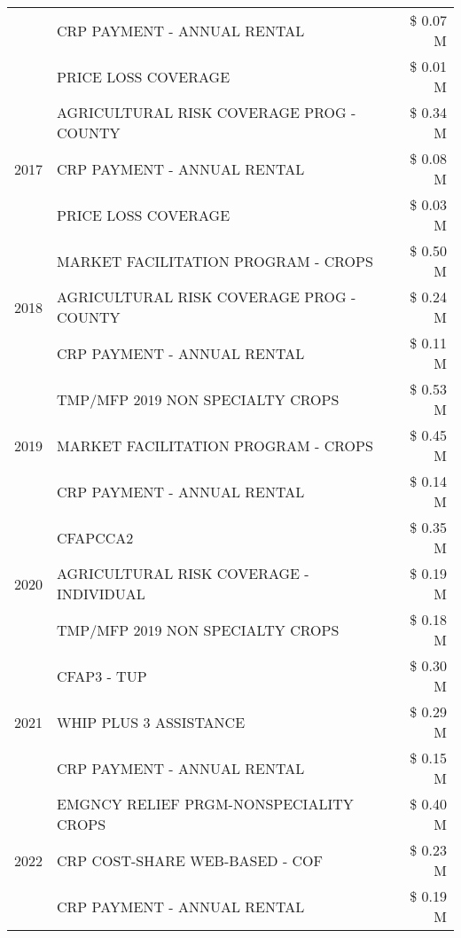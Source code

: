 \begin{tabular}{llr}
 & CRP PAYMENT - ANNUAL RENTAL & \$ 0.07 M \\
 & PRICE LOSS COVERAGE & \$ 0.01 M \\
\cline{1-3}
\multirow[t]{3}{*}{2017} & AGRICULTURAL RISK COVERAGE PROG - COUNTY & \$ 0.34 M \\
 & CRP PAYMENT - ANNUAL RENTAL & \$ 0.08 M \\
 & PRICE LOSS COVERAGE & \$ 0.03 M \\
\cline{1-3}
\multirow[t]{3}{*}{2018} & MARKET FACILITATION PROGRAM - CROPS & \$ 0.50 M \\
 & AGRICULTURAL RISK COVERAGE PROG - COUNTY & \$ 0.24 M \\
 & CRP PAYMENT - ANNUAL RENTAL & \$ 0.11 M \\
\cline{1-3}
\multirow[t]{3}{*}{2019} & TMP/MFP 2019 NON SPECIALTY CROPS & \$ 0.53 M \\
 & MARKET FACILITATION PROGRAM - CROPS & \$ 0.45 M \\
 & CRP PAYMENT - ANNUAL RENTAL & \$ 0.14 M \\
\cline{1-3}
\multirow[t]{3}{*}{2020} & CFAPCCA2 & \$ 0.35 M \\
 & AGRICULTURAL RISK COVERAGE - INDIVIDUAL & \$ 0.19 M \\
 & TMP/MFP 2019 NON SPECIALTY CROPS & \$ 0.18 M \\
\cline{1-3}
\multirow[t]{3}{*}{2021} & CFAP3 - TUP & \$ 0.30 M \\
 & WHIP PLUS 3 ASSISTANCE & \$ 0.29 M \\
 & CRP PAYMENT - ANNUAL RENTAL & \$ 0.15 M \\
\cline{1-3}
\multirow[t]{3}{*}{2022} & EMGNCY RELIEF PRGM-NONSPECIALITY CROPS & \$ 0.40 M \\
 & CRP COST-SHARE WEB-BASED - COF & \$ 0.23 M \\
 & CRP PAYMENT - ANNUAL RENTAL & \$ 0.19 M \\
\cline{1-3}
\bottomrule
\end{tabular}
